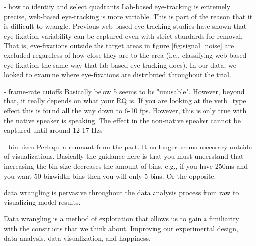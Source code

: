 - how to identify and select quadrants
Lab-based eye-tracking is extremely precise, web-based eye-tracking is more variable. This is part of the reason that it is difficult to wrangle. Previous web-based eye-tracking studies have shown that eye-fixation variability can be captured even with strict standards for removal. That is, eye-fixations outside the target areas in figure \ref{fig:signal_noise} are excluded regardless of how close they are to the area (i.e., classifying web-based eye-fixation the same way that lab-based eye tracking does). In our data, we looked to examine where eye-fixations are distributed throughout the trial.

- frame-rate cutoffs
Basically below 5 seems to be "unusable". However, beyond that, it really depends on what your RQ is. If you are looking at the verb\_type effect this is found all the way down to 6-10 fps. However, this is only true with the native speaker is speaking. The effect in the non-native speaker cannot be captured until around 12-17 Hzs

- bin sizes
Perhaps a remnant from the past. It no longer seems necessary outside of visualizations. Basically the guidance here is that you must understand that increasing the bin size decreases the amount of bins. e.g., if you have 250ms and you want 50 binwidth bins then you will only  5 bins. Or the opposite.


data wrangling is pervasive throughout the data analysis process from raw to visualizing model results.

Data wrangling is a method of exploration that allows us to gain a fimiliarity with the constructs that we think about. Improving our experimental design, data analysis, data visualization, and happiness.


